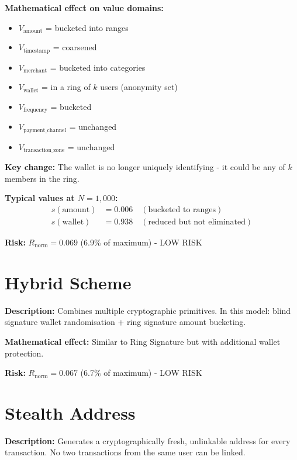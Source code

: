 \documentclass[12pt,a4paper,oneside,openany]{report}
\begin{document}
\textbf{Mathematical effect on value domains:}
\begin{itemize}
    \item $V_{\text{amount}}$ = bucketed into ranges
    \item $V_{\text{timestamp}}$ = coarsened
    \item $V_{\text{merchant}}$ = bucketed into categories
    \item $V_{\text{wallet}}$ = in a ring of $k$ users (anonymity set)
    \item $V_{\text{frequency}}$ = bucketed
    \item $V_{\text{payment\_channel}}$ = unchanged
    \item $V_{\text{transaction\_zone}}$ = unchanged
\end{itemize}

\textbf{Key change:} The wallet is no longer uniquely identifying - it could be any of $k$ members in the ring.

\textbf{Typical values at $N = 1,000$:}
\begin{align*}
s(\text{amount}) &= 0.006 \quad (\text{bucketed to ranges})\\
s(\text{wallet}) &= 0.938 \quad (\text{reduced but not eliminated})
\end{align*}

\textbf{Risk:} $R_{\mathrm{norm}} = 0.069$ (6.9\% of maximum) - LOW RISK

\section{Hybrid Scheme}
\label{sec:hybrid}

\textbf{Description:} Combines multiple cryptographic primitives. In this model: blind signature wallet randomisation + ring signature amount bucketing.

\textbf{Mathematical effect:} Similar to Ring Signature but with additional wallet protection.

\textbf{Risk:} $R_{\mathrm{norm}} = 0.067$ (6.7\% of maximum) - LOW RISK

\section{Stealth Address}
\label{sec:stealth}

\textbf{Description:} Generates a cryptographically fresh, unlinkable address for every transaction. No two transactions from the same user can be linked.
\end{document}
